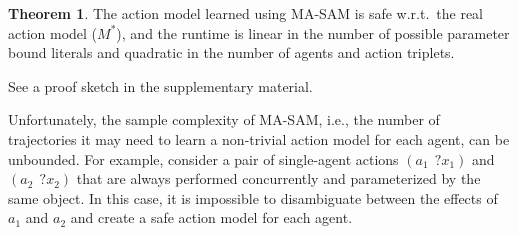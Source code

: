\documentclass[letterpaper]{article} %
\theoremstyle{definition}
\newtheorem{theorem}{Theorem}
\theoremstyle{remark}
\newcommand{\realm}{\ensuremath{M^*}\xspace}
\newcommand{\masam}{\ac{MA-SAM}\xspace}
\begin{document}


\begin{theorem}
\label{lemma:ma-sam}
The action model learned using \masam is safe w.r.t.\  the real action model (\realm), and the runtime is linear in the number of possible parameter bound literals and quadratic in the number of agents and action triplets.
\end{theorem}
\noindent See a proof sketch in the supplementary material.


Unfortunately, the sample complexity of \masam, i.e., the number of trajectories it may need to learn a non-trivial action model for each agent, can be unbounded.
For example, consider a pair of single-agent actions $(a_1~~ ?x_1)$ and $(a_2~~ ?x_2)$ that are always performed concurrently and parameterized by the same object.
In this case, it is impossible to disambiguate between the effects of $a_1$ and $a_2$ and create a safe action model for each agent.











\end{document}
